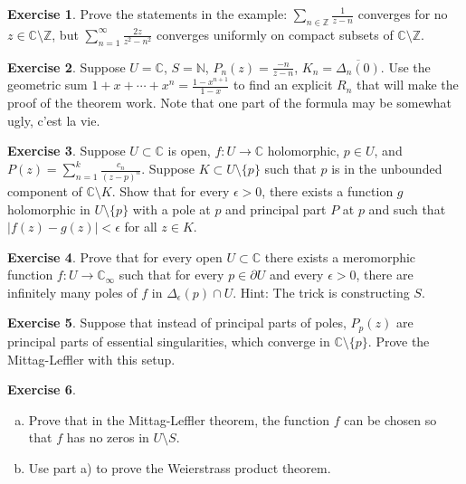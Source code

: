 \documentclass[12pt,openany]{book}
\newcommand{\sabs}[1]{\lvert {#1} \rvert}
\newcommand{\C}{{\mathbb{C}}}
\newcommand{\Z}{{\mathbb{Z}}}
\newcommand{\N}{{\mathbb{N}}}
\theoremstyle{plain}
\theoremstyle{remark}
\theoremstyle{definition}
\newenvironment{exbox}{%
    \def\FrameCommand{\vrule width 1pt \relax\hspace{10pt}}%
    \MakeFramed{\advance\hsize-\width\FrameRestore}%
}{%
    \endMakeFramed
}
\newenvironment{exparts}{%
    \leavevmode\begin{enumerate}[a),noitemsep,topsep=0pt,parsep=0pt,partopsep=0pt]
}{%
    \end{enumerate}
}
\theoremstyle{exercise}
\newtheorem{exercise}{Exercise}[section]
\theoremstyle{example}
\begin{document}
\begin{exbox}
\begin{exercise}
Prove the statements in the example: 
$\sum_{n\in \Z} \frac{1}{z-n}$
converges for no $z \in \C \setminus \Z$, but
$\sum_{n=1}^\infty
\frac{2z}{z^2-n^2}$
converges uniformly on compact subsets of $\C \setminus \Z$.
\end{exercise}

\begin{exercise}
Suppose $U = \C$, $S = \N$, $P_n(z) = \frac{-n}{z-n}$, $K_n =
\overline{\Delta_n(0)}$.  Use the geometric sum $1+x+\cdots+x^n =
\frac{1-x^{n+1}}{1-x}$ to find an explicit $R_n$ that will make the proof
of the theorem work.
Note that one part of the formula may be somewhat ugly, c'est la vie.
\end{exercise}

\begin{exercise}
Suppose $U \subset \C$ is open, $f \colon U \to \C$ holomorphic,
$p \in U$, and
$P(z) = \sum_{n=1}^{k} \frac{c_n}{{(z-p)}^n}$.
Suppose
$K \subset U \setminus \{ p \}$ such that $p$ is in the unbounded
component of $\C \setminus K$.  Show that for every $\epsilon > 0$,
there exists a function $g$ holomorphic in $U \setminus \{ p \}$
with a pole at $p$ and principal part $P$ at $p$ and such that
$\sabs{f(z)-g(z)} < \epsilon$ for all $z \in K$.
\end{exercise}

\begin{exercise}
Prove that for every open $U \subset \C$ there exists a meromorphic function
$f \colon U \to \C_\infty$ such that for every $p \in \partial U$
and every $\epsilon > 0$, there are infinitely many poles of $f$ in
$\Delta_{\epsilon}(p) \cap U$.  Hint: The trick is constructing $S$.
\end{exercise}

\begin{exercise}
Suppose that instead of principal parts of poles, $P_p(z)$ are principal
parts of essential singularities, which converge in $\C \setminus \{ p \}$.
Prove the Mittag-Leffler with this setup.
\end{exercise}

\begin{exercise}
\begin{exparts}
\item
Prove that in the Mittag-Leffler theorem, the function $f$ can be chosen
so that $f$ has no zeros in $U \setminus S$.
\item
Use part a) to prove the Weierstrass product theorem.
\end{exparts}
\end{exercise}
\end{exbox}
\end{document}

